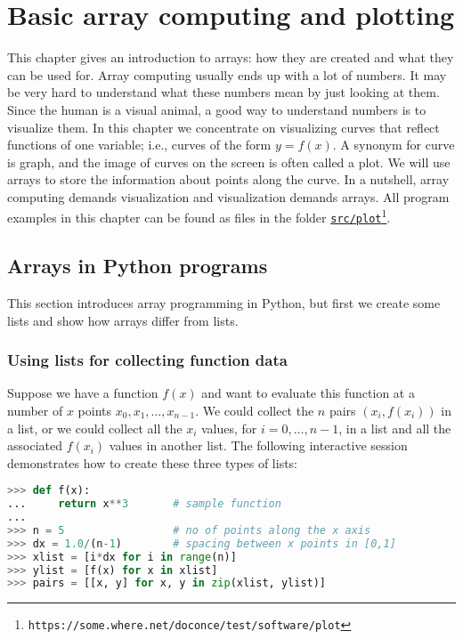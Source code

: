\documentclass[graybox,sectrefs,envcountresetchap,open=right,final]{svmonodo}
\begin{document}
\chapter{Basic array computing and plotting}
This chapter gives an introduction to arrays: how they are created
and what they can be used for.  Array computing usually ends up with a
lot of numbers. It may be very hard to understand what these numbers
mean by just looking at them. Since the human is a visual animal, a
good way to understand numbers is to visualize them. In this
chapter we concentrate on visualizing curves that reflect functions
of one variable; i.e., curves of the form $y=f(x)$.  A synonym for
curve is graph, and the image of curves on the screen is often called
a plot.  We will use arrays to store the information about points
along the curve. In a nutshell, array computing demands visualization
and visualization demands arrays.
All program examples in this chapter can be found as files in the
folder \href{{https://some.where.net/doconce/test/software/plot}}{\nolinkurl{src/plot}\footnote{\texttt{https://some.where.net/doconce/test/software/plot}}}.
\section{Arrays in Python programs}
\label{sec:plot:arraycomp}
This section introduces array programming in Python, but first we
create some lists and show how arrays differ from lists.
\subsection{Using lists for collecting function data}
\label{sec:plot:listdata}
Suppose we have a function $f(x)$ and want to evaluate this function
at a number of $x$ points $x_0,x_1,\ldots,x_{n-1}$.  We could collect
the $n$ pairs $(x_i,f(x_i))$ in a list, or we could collect all the
$x_i$ values, for $i=0,\ldots,n-1$, in a list and all the associated
$f(x_i)$ values in another list.  The following interactive session
demonstrates how to create these three types of lists:
\begin{lstlisting}[language=Python,style=simple,xleftmargin=2mm]
>>> def f(x):
...     return x**3       # sample function
...
>>> n = 5                 # no of points along the x axis
>>> dx = 1.0/(n-1)        # spacing between x points in [0,1]
>>> xlist = [i*dx for i in range(n)]
>>> ylist = [f(x) for x in xlist]
>>> pairs = [[x, y] for x, y in zip(xlist, ylist)]

\end{lstlisting}
\end{document}
